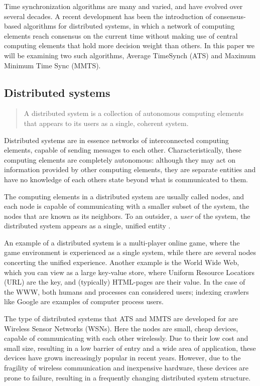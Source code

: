 \documentclass[a4paper,12pt]{article}
\begin{document}
Time synchronization algorithms are many and varied, and have evolved over several decades. A recent development has been the introduction of consensus-based algorithms for distributed systems, in which a network of computing elements reach consensus on the current time without making use of central computing elements that hold more decision weight than others. In this paper we will be examining two such algorithms, Average TimeSynch (ATS) and Maximum Minimum Time Sync (MMTS).

\subsection{Distributed systems}

\begin{quote}
  A distributed system is a collection of autonomous computing
  elements that appears to its users as a single, coherent
  system.\cite{TanenbaumSteen06}
\end{quote}

Distributed systems are in essence networks of interconnected computing elements, capable of sending messages to each other. Characteristically, these computing elements are completely autonomous: although they may act on information provided by other computing elements, they are separate entities and have no knowledge of each others state beyond what is communicated to them.

The computing elements in a distributed system are usually called nodes, and each node is capable of communicating with a smaller subset of the system, the nodes that are known as its neighbors. To an outsider, a \textit{user} of the system, the distributed system appears as a single, unified entity \cite{TanenbaumSteen06}.

An example of a distributed system is a multi-player online game, where
the game environment is experienced as a single system, while there
are several nodes concerting the unified experience.  Another example
is the World Wide Web, which you can view as a large key-value store,
where Uniform Resource Locatiors (URL) are the key, and (typically)
HTML-pages are their value.  In the case of the WWW, both humans and
processes can considered users; indexing crawlers like Google are
examples of computer process users.

The type of distributed systems that ATS and MMTS are developed for are Wireless Sensor
Networks (WSNs).  Here the nodes are small, cheap devices, capable of communicating with each other wirelessly. Due to their low cost and small size, resulting in a low barrier of entry and a wide area of application, these devices have grown increasingly popular in recent years. However, due to the fragility of wireless communication and inexpensive hardware, these devices are prone to failure, resulting in a frequently changing distributed system structure\cite{SchenatoFiorentin11}.
\end{document}
